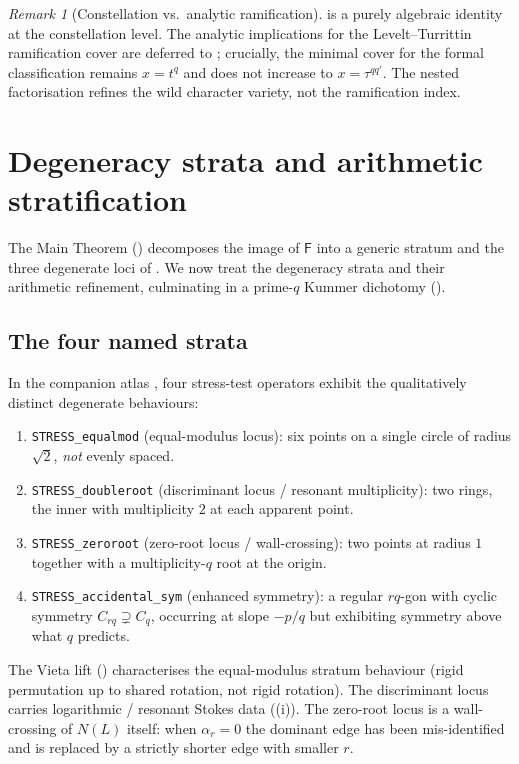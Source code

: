 \documentclass[11pt,a4paper]{article}
\theoremstyle{plain}
\theoremstyle{definition}
\theoremstyle{remark}
\newtheorem{remark}[theorem]{Remark}
\newcommand{\NL}{N(L)}
\newcommand{\Fclass}{\mathsf{F}}
\begin{document}
\begin{remark}[Constellation vs.\ analytic ramification]\label{rem:N1-analytic}
 is a purely algebraic identity at the constellation level.
The analytic implications for the Levelt--Turrittin ramification cover are
deferred to ; crucially, the minimal cover for the formal
classification remains $x = t^q$ and does not increase to $x = \tau^{qq'}$.
The nested factorisation refines the wild character variety, not the
ramification index.
\end{remark}


\section{Degeneracy strata and arithmetic stratification}\label{sec:degeneracy}

The Main Theorem () decomposes the image of $\Fclass$
into a generic stratum and the three degenerate loci of
. We now treat the degeneracy strata and their
arithmetic refinement, culminating in a prime-$q$ Kummer dichotomy
().

\subsection{The four named strata}\label{ssec:strata-named}

In the companion atlas \cite{wkb_dataset_v1}, four stress-test operators
exhibit the qualitatively distinct degenerate behaviours:
\begin{enumerate}[leftmargin=2em]
\item \texttt{STRESS\_equalmod} (equal-modulus locus): six points on a
      single circle of radius $\sqrt{2}$, \emph{not} evenly spaced.
\item \texttt{STRESS\_doubleroot} (discriminant locus / resonant
      multiplicity): two rings, the inner with multiplicity $2$ at each
      apparent point.
\item \texttt{STRESS\_zeroroot} (zero-root locus / wall-crossing): two
      points at radius $1$ together with a multiplicity-$q$ root at the
      origin.
\item \texttt{STRESS\_accidental\_sym} (enhanced symmetry): a regular
      $rq$-gon with cyclic symmetry $C_{rq} \supsetneq C_q$, occurring at
      slope $-p/q$ but exhibiting symmetry above what $q$ predicts.
\end{enumerate}
The Vieta lift () characterises the equal-modulus stratum
behaviour (rigid permutation up to shared rotation, not rigid rotation).
The discriminant locus carries logarithmic / resonant Stokes data
((i)). The zero-root locus is a wall-crossing of
$\NL$ itself: when $\alpha_r = 0$ the dominant edge has been mis-identified
and is replaced by a strictly shorter edge with smaller $r$.
\end{document}
